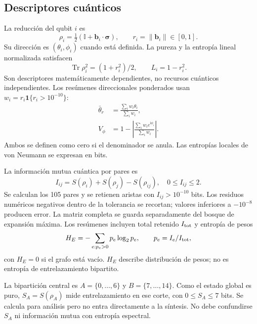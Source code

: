 \documentclass[pdflatex,iicol,sn-basic,Numbered]{sn-jnl}
\begin{document}
\subsection{Descriptores cuánticos}
La reducción del qubit $i$ es
\begin{equation}
\rho_i=\tfrac12(\mathbb I+\mathbf b_i\cdot\boldsymbol\sigma),\qquad r_i=\|\mathbf b_i\|\in[0,1].
\end{equation}
Su dirección es $(\theta_i,\phi_i)$ cuando está definida. La pureza y la entropía lineal normalizada satisfacen
\begin{equation}
\operatorname{Tr}\rho_i^2=(1+r_i^2)/2,\qquad L_i=1-r_i^2.
\end{equation}
Son descriptores matemáticamente dependientes, no recursos cuánticos independientes. Los resúmenes direccionales ponderados usan $w_i=r_i\mathbf1\{r_i>10^{-10}\}$:
\begin{align}
\bar\theta_r&=\frac{\sum_i w_i\theta_i}{\sum_i w_i},\\
V_\phi&=1-\left|\frac{\sum_i w_i e^{\mathrm i\phi_i}}{\sum_i w_i}\right|.
\end{align}
Ambos se definen como cero si el denominador se anula. Las entropías locales de von Neumann se expresan en bits.

La información mutua cuántica por pares es
\begin{equation}
I_{ij}=S(\rho_i)+S(\rho_j)-S(\rho_{ij}),\quad 0\le I_{ij}\le2.
\end{equation}
Se calculan los 105 pares y se retienen aristas con $I_{ij}>10^{-10}$ bits. Los residuos numéricos negativos dentro de la tolerancia se recortan; valores inferiores a $-10^{-8}$ producen error. La matriz completa se guarda separadamente del bosque de expansión máxima. Los resúmenes incluyen total retenido $I_{\rm tot}$ y entropía de pesos
\begin{equation}
H_E=-\sum_{e:p_e>0}p_e\log_2p_e,\qquad p_e=I_e/I_{\rm tot},
\end{equation}
con $H_E=0$ si el grafo está vacío. $H_E$ describe distribución de pesos; no es entropía de entrelazamiento bipartito.

La bipartición central es $A=\{0,\ldots,6\}$ y $B=\{7,\ldots,14\}$. Como el estado global es puro, $S_A=S(\rho_A)$ mide entrelazamiento en ese corte, con $0\le S_A\le7$ bits. Se calcula para análisis pero no entra directamente a la síntesis. No debe confundirse $S_A$ ni información mutua con entropía espectral.
\end{document}
